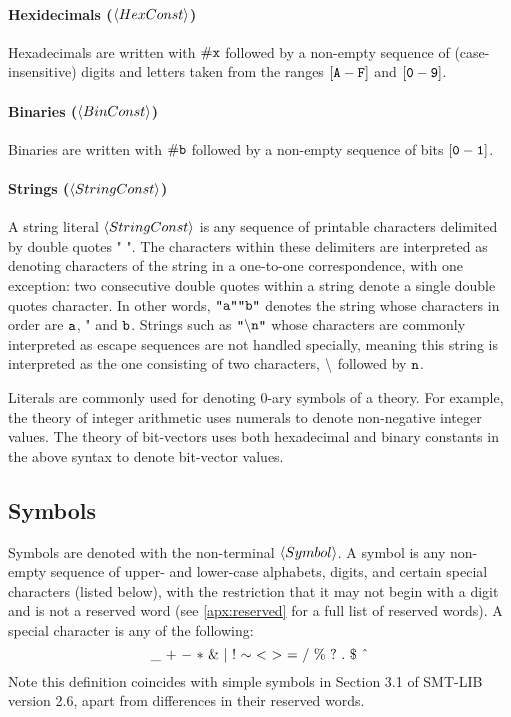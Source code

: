 \documentclass[english,a4paper,10pt]{article}
\newcommand{\mathcircumflex}[0]{\mbox{\^{}}}
\begin{document}
\paragraph{Hexidecimals ($\left\langle HexConst\right\rangle$)}
Hexadecimals are written with ${\tt \#x}$
followed by a non-empty sequence of (case-insensitive) 
digits and letters taken from the ranges $\left[{\tt A}-{\tt F}\right]$
and $\left[{\tt 0}-{\tt 9}\right]$.

\paragraph{Binaries ($\left\langle BinConst\right\rangle$)}
Binaries are written with ${\tt \#b}$
followed by a non-empty sequence of bits $\left[{\tt 0}-{\tt 1}\right]$.

\paragraph{Strings ($\left\langle StringConst\right\rangle$)}
A string literal $\left\langle StringConst\right\rangle$
is any sequence of printable characters
delimited by double quotes $\texttt{"}$ $\texttt{"}$.
The characters within these delimiters
are interpreted as denoting characters of the string in a one-to-one correspondence,
with one exception:
two consecutive double quotes within a string
denote a single double quotes character.
In other words, $\texttt{"}{\tt a}\texttt{"}\texttt{"}{\tt b}\texttt{"}$ denotes the string
whose characters in order are ${\tt a}$, $\texttt{"}$ and ${\tt b}$.
Strings such as $\texttt{"}{\tt \backslash n}\texttt{"}$ whose characters are commonly
interpreted as escape sequences are not handled specially,
meaning this string is interpreted 
as the one consisting of two characters, ${\tt \backslash}$ followed by ${\tt n}$.

\noindent
Literals are commonly
used for denoting 0-ary symbols of a theory.
For example, 
the theory of integer arithmetic 
uses numerals to denote non-negative integer values.
The theory of bit-vectors uses both
hexadecimal and binary constants in the above syntax
to denote bit-vector values.

\subsection{Symbols}

Symbols are denoted with the non-terminal $\left\langle Symbol\right\rangle$. 
A symbol
is any non-empty sequence of upper- and lower-case alphabets, digits,
and certain special characters (listed below), with the restriction that it may not
begin with a digit and is not a reserved word (see \cref{apx:reserved} 
for a full list of reserved words).
A special character is any of the following:
\[
{\tt \_}\mbox{ }{\tt +}\mbox{ }{\tt -}\mbox{ }{\tt *}\mbox{ }{\tt \&}\mbox{ }{\tt |}\mbox{ }{\tt !}\mbox{ }{\tt \sim}\mbox{ }{\tt <}\mbox{ }{\tt >}\mbox{ }{\tt =}\mbox{ }{\tt /}\mbox{ }{\tt \%}\mbox{ }{\tt ?}\mbox{ }{\tt .}\mbox{ }{\tt \$}\mbox{ }{\tt \mathcircumflex}
\]
Note this definition coincides with simple
symbols in Section 3.1 of SMT-LIB version 2.6,
apart from differences in their reserved words.
\end{document}
